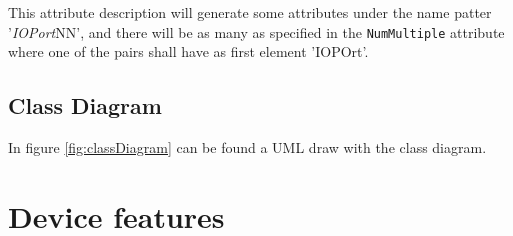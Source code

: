 \documentclass[a4paper,10pt]{article}
\begin{document}
This attribute description will generate some attributes under the name patter '\emph{IOPort}NN', and there will be as many as specified in the \texttt{NumMultiple} attribute where one of the pairs shall have as first element 'IOPOrt'.

\subsection{Class Diagram}\label{sec:classDiagram}

In figure \ref{fig:classDiagram} can be found a UML draw with the class diagram.

\begin{figure}[h!]
\end{figure}

\section{Device features}\label{sec:devFeatures}
\end{document}
